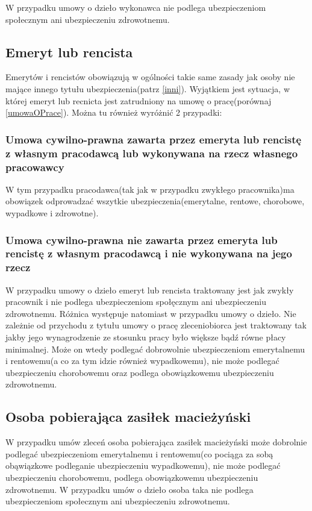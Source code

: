 W przypadku umowy o dzieło wykonawca nie podlega ubezpieczeniom społecznym ani ubezpieczeniu zdrowotnemu.

\subsection[Emeryt lub rencista][Emeryt lub rencista]{Emeryt lub rencista}
Emerytów i rencistów obowiązują w ogólności takie same zasady jak osoby nie mające innego tytułu ubezpieczenia(patrz \ref{inni}).
Wyjątkiem jest sytuacja, w której emeryt lub recnicta jest zatrudniony na umowę o pracę(porównaj \ref{umowaOPrace}). Można tu również wyróżnić 2 przypadki:

\subsubsection{Umowa cywilno-prawna zawarta przez emeryta lub rencistę z własnym pracodawcą lub wykonywana na rzecz własnego pracowawcy}
W tym przypadku pracodawca(tak jak w przypadku zwykłego pracownika)ma obowiązek odprowadzać wszytkie ubezpieczenia(emerytalne, rentowe, chorobowe, wypadkowe i zdrowotne).

\subsubsection{Umowa cywilno-prawna nie zawarta przez emeryta lub rencistę z własnym pracodawcą i nie wykonywana na jego rzecz}
W przypadku umowy o dzieło emeryt lub rencista traktowany jest jak zwykły pracownik i nie podlega ubezpieczeniom społęcznym ani ubezpieczeniu zdrowotnemu. Różnica występuje natomiast w przypadku umowy o dzieło. Nie zależnie od przychodu z tytułu umowy o pracę zleceniobiorca jest traktowany tak jakby jego wynagrodzenie ze stosunku pracy było większe bądź równe płacy minimalnej. Może on wtedy podlegać dobrowolnie ubezpieczeniom emerytalnemu i rentowemu(a co za tym idzie również wypadkowemu), nie może podlegać ubezpieczeniu chorobowemu oraz podlega obowiązkowemu ubezpieczeniu zdrowotnemu.

\subsection[Osoba pobierająca zasiłek macieżyński][Osoba pobierająca zasiłek macieżyński]{Osoba pobierająca zasiłek macieżyński}
W przypadku umów zleceń osoba pobierająca zasiłek macieżyński może dobrolnie podlegać ubezpieczeniom emerytalnemu i rentowemu(co pociąga za sobą obąwiązkowe podleganie ubezpieczeniu wypadkowemu), nie może podlegać ubezpieczeniu chorobowemu, podlega obowiązkowemu ubezpieczeniu zdrowotnemu. W przypadku umów o dzieło osoba taka nie podlega ubezpieczeniom społecznym ani ubezpieczeniu zdrowotnemu.

